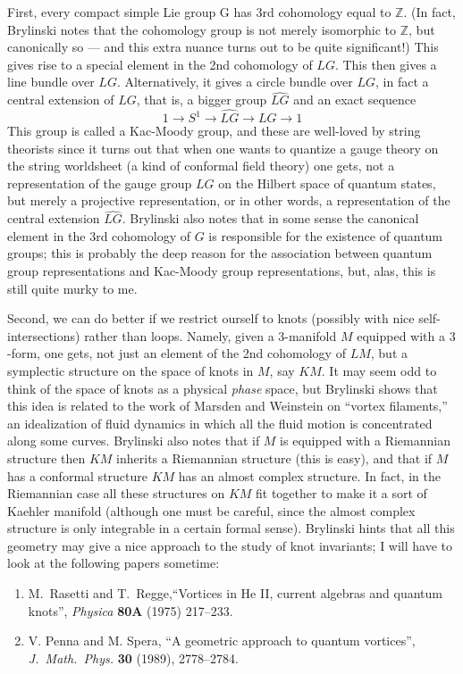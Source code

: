 \documentclass{article}
\begin{document}
First, every compact simple Lie group G has 3rd cohomology equal to
\(\mathbb{Z}\). (In fact, Brylinski notes that the cohomology group is
not merely isomorphic to \(\mathbb{Z}\), but canonically so --- and this
extra nuance turns out to be quite significant!) This gives rise to a
special element in the 2nd cohomology of \(LG\). This then gives a line
bundle over \(LG\). Alternatively, it gives a circle bundle over \(LG\),
in fact a central extension of \(LG\), that is, a bigger group
\(\widehat{LG}\) and an exact sequence
\[1 \to S^1 \to \widehat{LG} \to LG \to 1\] This group is called a
Kac-Moody group, and these are well-loved by string theorists since it
turns out that when one wants to quantize a gauge theory on the string
worldsheet (a kind of conformal field theory) one gets, not a
representation of the gauge group \(LG\) on the Hilbert space of quantum
states, but merely a projective representation, or in other words, a
representation of the central extension \(\widehat{LG}\). Brylinski also
notes that in some sense the canonical element in the 3rd cohomology of
\(G\) is responsible for the existence of quantum groups; this is
probably the deep reason for the association between quantum group
representations and Kac-Moody group representations, but, alas, this is
still quite murky to me.

Second, we can do better if we restrict ourself to knots (possibly with
nice self-intersections) rather than loops. Namely, given a 3-manifold
\(M\) equipped with a \(3\)-form, one gets, not just an element of the
2nd cohomology of \(LM\), but a symplectic structure on the space of
knots in \(M\), say \(KM\). It may seem odd to think of the space of
knots as a physical \emph{phase} space, but Brylinski shows that this
idea is related to the work of Marsden and Weinstein on ``vortex
filaments,'' an idealization of fluid dynamics in which all the fluid
motion is concentrated along some curves. Brylinski also notes that if
\(M\) is equipped with a Riemannian structure then \(KM\) inherits a
Riemannian structure (this is easy), and that if \(M\) has a conformal
structure \(KM\) has an almost complex structure. In fact, in the
Riemannian case all these structures on \(KM\) fit together to make it a
sort of Kaehler manifold (although one must be careful, since the almost
complex structure is only integrable in a certain formal sense).
Brylinski hints that all this geometry may give a nice approach to the
study of knot invariants; I will have to look at the following papers
sometime:

\begin{enumerate}
\def\labelenumi{\arabic{enumi})}
\setcounter{enumi}{2}
\item
  M.\ Rasetti and T.\ Regge,``Vortices in He II, current algebras and quantum knots'', \emph{Physica} \textbf{80A} (1975) 217--233.
\item
   V. Penna and M. Spera, ``A geometric approach to quantum vortices'',
  \emph{J.\ Math.\ Phys.} \textbf{30} (1989), 2778--2784.
\end{enumerate}
\end{document}
